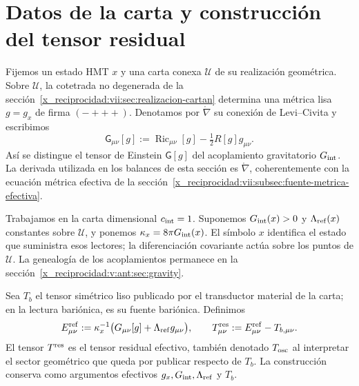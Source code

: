 \section{Datos de la carta y construcción del tensor residual}
\label{x_reciprocidad:vii:subsec:datos-tensor-residual}

Fijemos un estado HMT \(x\) y una carta conexa \(\mathcal U\) de su
realización geométrica. Sobre \(\mathcal U\), la cotetrada no degenerada
de la sección~\ref{x_reciprocidad:vii:sec:realizacion-cartan} determina una métrica lisa
\(g=g_x\) de firma \((-+++)\). Denotamos por
\(\mathring\nabla\) su conexión de Levi--Civita y escribimos
\[
 \mathsf G_{\mu\nu}[g]
 :=\operatorname{Ric}_{\mu\nu}[g]-\tfrac12R[g]g_{\mu\nu}.
\]
Así se distingue el tensor de Einstein \(\mathsf G[g]\) del acoplamiento
gravitatorio \(G_{\rm int}\). La derivada utilizada en los balances
de esta sección es \(\mathring\nabla\), coherentemente con la ecuación
métrica efectiva de la sección~\ref{x_reciprocidad:vii:subsec:fuente-metrica-efectiva}.

Trabajamos en la carta dimensional \(c_{\rm int}=1\). Suponemos
\(G_{\rm int}(x)>0\) y \(\Lambda_{\rm ref}(x)\) constantes sobre
\(\mathcal U\), y ponemos \(\kappa_x=8\pi G_{\rm int}(x)\).
El símbolo \(x\) identifica el estado que suministra esos lectores;
la diferenciación covariante actúa sobre los puntos de \(\mathcal U\).
La genealogía de los acoplamientos permanece en la
sección~\ref{x_reciprocidad:v:ant:sec:gravity}.

Sea \(T_b\) el tensor simétrico liso publicado por el transductor material
de la carta; en la lectura bariónica, es su fuente bariónica. Definimos
\begin{equation}
 \mathcal E^{\rm ref}_{\mu\nu}
 :=\kappa_x^{-1}\bigl(\mathsf G_{\mu\nu}[g]
                            +\Lambda_{\rm ref}g_{\mu\nu}\bigr),
 \qquad
 T^{\rm res}_{\mu\nu}:=\mathcal E^{\rm ref}_{\mu\nu}-T_{b,\mu\nu}.
 \label{x_reciprocidad:vii:eq:residual-definicion}
\end{equation}
El tensor \(T^{\rm res}\) es el tensor residual efectivo, también
denotado \(T_{\rm osc}\) al interpretar el sector geométrico que queda
por publicar respecto de \(T_b\). La construcción conserva como
argumentos efectivos \(g_x,G_{\rm int},\Lambda_{\rm ref}\) y \(T_b\).

